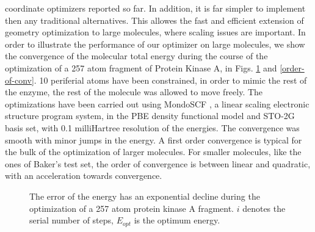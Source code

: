 \documentclass[prl,aps,twocolumn,showpacs,twocolumngrid,superbib]{revtex4}
\begin{document}
coordinate optimizers reported so far. In addition, it is far simpler
to implement then any traditional alternatives.
This allowes the fast and efficient 
extension of geometry optimization 
to large molecules, where scaling issues are important.
In order to illustrate the performance of our optimizer on large
molecules, we show the convergence of the molecular total energy
during the course of the optimization of a 257 atom
fragment of Protein Kinase A, in Figs. \ref{logn-logde} 
and \ref{order-of-conv}. 10 periferial atoms have been 
constrained, in order to mimic the rest of the enzyme, 
the rest of the molecule was allowed to move freely.
The optimizations have been carried out 
using MondoSCF \cite{MondoSCF}, a linear scaling electronic structure
program system, in the PBE density functional model and 
STO-2G basis set, with 0.1 milliHartree resolution of the energies.
The convergence was smooth with minor jumps in the energy.
A first order convergence is typical for the bulk of the optimization
of larger molecules. For smaller molecules, like the ones of Baker's
test set, the order of convergence is between linear and quadratic,
with an acceleration towards convergence.
\begin{figure}[h]
\caption{
\small  
The error of the energy has an exponential decline during
the optimization of a 257 atom protein kinase A fragment. 
$i$ denotes the serial number of steps,
$E_{opt}$ is the optimum energy.
\label{logn-logde}
}
\end{figure}
\end{document}
